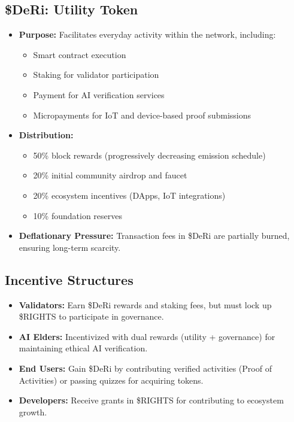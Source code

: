 \documentclass[11pt,a4paper]{article}
\begin{document}
\subsection{\$DeRi: Utility Token}
\begin{itemize}
    \item \textbf{Purpose:} Facilitates everyday activity within the network, including:  
        \begin{itemize}
            \item Smart contract execution  
            \item Staking for validator participation  
            \item Payment for AI verification services  
            \item Micropayments for IoT and device-based proof submissions  
        \end{itemize}
    \item \textbf{Distribution:}  
        \begin{itemize}
            \item 50\% block rewards (progressively decreasing emission schedule)  
            \item 20\% initial community airdrop and faucet  
            \item 20\% ecosystem incentives (DApps, IoT integrations)  
            \item 10\% foundation reserves  
        \end{itemize}
    \item \textbf{Deflationary Pressure:} Transaction fees in \$DeRi are partially burned, ensuring long-term scarcity.  
\end{itemize}

\subsection{Incentive Structures}
\begin{itemize}
    \item \textbf{Validators:} Earn \$DeRi rewards and staking fees, but must lock up \$RIGHTS to participate in governance.  
    \item \textbf{AI Elders:} Incentivized with dual rewards (utility + governance) for maintaining ethical AI verification.  
    \item \textbf{End Users:} Gain \$DeRi by contributing verified activities (Proof of Activities) or passing quizzes for acquiring tokens.  
    \item \textbf{Developers:} Receive grants in \$RIGHTS for contributing to ecosystem growth.  
\end{itemize}
\end{document}
